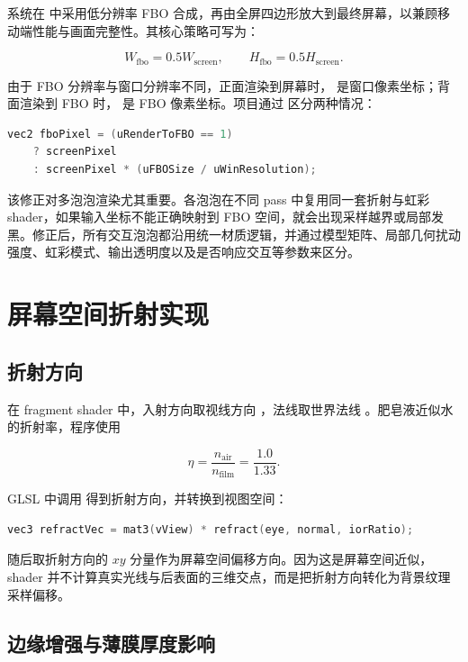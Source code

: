系统在  中采用低分辨率 FBO 合成，再由全屏四边形放大到最终屏幕，以兼顾移动端性能与画面完整性。其核心策略可写为：

\[
W_{\mathrm{fbo}} = 0.5 W_{\mathrm{screen}}, \qquad
H_{\mathrm{fbo}} = 0.5 H_{\mathrm{screen}}.
\]

由于 FBO 分辨率与窗口分辨率不同，正面渲染到屏幕时， 是窗口像素坐标；背面渲染到 FBO 时， 是 FBO 像素坐标。项目通过  区分两种情况：

\begin{lstlisting}[language=C++]
vec2 fboPixel = (uRenderToFBO == 1)
    ? screenPixel
    : screenPixel * (uFBOSize / uWinResolution);
\end{lstlisting}

该修正对多泡泡渲染尤其重要。各泡泡在不同 pass 中复用同一套折射与虹彩 shader，如果输入坐标不能正确映射到 FBO 空间，就会出现采样越界或局部发黑。修正后，所有交互泡泡都沿用统一材质逻辑，并通过模型矩阵、局部几何扰动强度、虹彩模式、输出透明度以及是否响应交互等参数来区分。

\section{屏幕空间折射实现}

\subsection{折射方向}

在 fragment shader 中，入射方向取视线方向 ，法线取世界法线 。肥皂液近似水的折射率，程序使用

\[
\eta = \frac{n_{\mathrm{air}}}{n_{\mathrm{film}}} = \frac{1.0}{1.33}.
\]

GLSL 中调用  得到折射方向，并转换到视图空间：

\begin{lstlisting}[language=C++]
vec3 refractVec = mat3(vView) * refract(eye, normal, iorRatio);
\end{lstlisting}

随后取折射方向的 $xy$ 分量作为屏幕空间偏移方向。因为这是屏幕空间近似，shader 并不计算真实光线与后表面的三维交点，而是把折射方向转化为背景纹理采样偏移。

\subsection{边缘增强与薄膜厚度影响}

